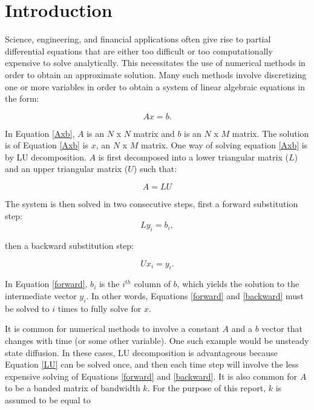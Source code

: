 \documentclass[12pt]{article}
\begin{document}
\newpage
\tableofcontents
\newpage
\section{Introduction}
\label{sec:introduction}

Science, engineering, and financial applications often give rise to partial
differential equations that are either too difficult or too computationally
expensive to solve analytically. This necessitates the use of numerical
methods in order to obtain an approximate solution. Many such methods involve
discretizing one or more variables in order to obtain a system of linear algebraic
equations in the form:

\begin{equation}
\label{Axb}
Ax=b.
\end{equation}

In Equation \ref{Axb}, $A$ is an $N$ x $N$ matrix and $b$ is  an $N$ x $M$
matrix. The solution is of Equation \ref{Axb} is $x$, an $N$ x $M$ matrix. One
way of solving equation \ref{Axb} is by LU decomposition. $A$ is first
decomposed into a lower triangular matrix ($L$) and an upper triangular matrix
($U$) such that:

\begin{equation}
\label{LU}
A = LU
\end{equation}

The system is then solved in two consecutive steps, first a forward substitution step:
\begin{equation}
\label{forward}
Ly_i = b_i,
\end{equation}

then a backward substitution step:

\begin{equation}
\label{backward}
Ux_i = y_i.
\end{equation}

In Equation \ref{forward}, $b_i$ is the $i^{th}$ column of $b$, which yields
the solution to the intermediate vector $y_i$. In other words, Equations
\ref{forward} and \ref{backward} must be solved to $i$ times to fully solve for
$x$.

It is common for numerical methods to involve a constant $A$ and a
$b$ vector that changes with time (or some other variable). One such example
would be unsteady state diffusion. In these cases, LU decomposition is
advantageous because Equation \ref{LU} can be solved once, and then each
time step will involve the less expensive solving of Equations \ref{forward} and
\ref{backward}. It is also common for $A$ to be a banded matrix of bandwidth $k$. For the
purpose of this report, $k$ is assumed to be equal to
\end{document}

